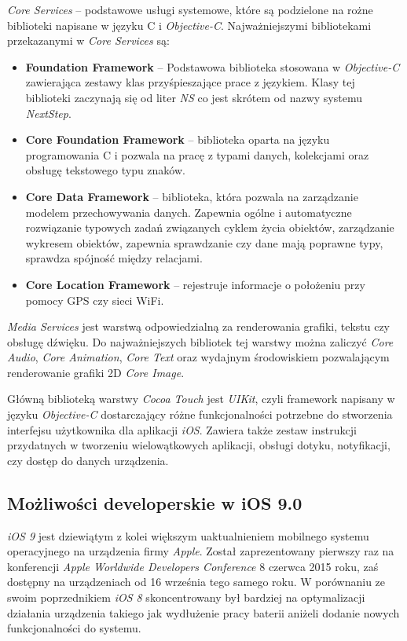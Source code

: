 \documentclass{iiuwb}
\begin{document}
\textit{Core Services} -- podstawowe usługi systemowe, które są podzielone na rożne biblioteki napisane w języku C i \textit{Objective-C}. Najważniejszymi bibliotekami przekazanymi w \textit{Core Services} są:
\begin{itemize}
\item \textbf{Foundation Framework} -- Podstawowa biblioteka stosowana w \textit{Objective-C} zawierająca zestawy klas przyśpieszające prace z językiem. Klasy tej biblioteki zaczynają się od liter \textit{NS} co jest skrótem od nazwy systemu \textit{NextStep}.
\item \textbf{Core Foundation Framework} -- biblioteka oparta na języku programowania C i pozwala na pracę z typami danych, kolekcjami oraz obsługę tekstowego typu znaków.
\item \textbf{Core Data Framework} -- biblioteka, która pozwala na zarządzanie modelem przechowywania danych. Zapewnia ogólne i automatyczne rozwiązanie typowych zadań związanych cyklem życia obiektów, zarządzanie wykresem obiektów, zapewnia sprawdzanie czy dane mają poprawne typy, sprawdza spójność między relacjami.
\item \textbf{Core Location Framework} -- rejestruje informacje o położeniu przy pomocy GPS czy sieci WiFi.
\end{itemize} 
\textit{Media Services} jest warstwą odpowiedzialną za renderowania grafiki, tekstu czy obsługę dźwięku. Do najważniejszych bibliotek tej warstwy można zaliczyć \textit{Core Audio}, \textit{Core Animation}, \textit{Core Text} oraz wydajnym środowiskiem pozwalającym renderowanie grafiki 2D \textit{Core Image}.

Główną biblioteką warstwy \textit{Cocoa Touch} jest \textit{UIKit}, czyli framework napisany w języku \textit{Objective-C} dostarczający różne funkcjonalności potrzebne do stworzenia interfejsu użytkownika dla aplikacji \textit{iOS}. Zawiera także zestaw instrukcji przydatnych w tworzeniu wielowątkowych aplikacji, obsługi dotyku, notyfikacji, czy dostęp do danych urządzenia.

\subsection{Możliwości developerskie w iOS 9.0}
\textit{iOS 9} jest dziewiątym z kolei większym uaktualnieniem mobilnego systemu operacyjnego na urządzenia firmy \textit{Apple}. Został zaprezentowany pierwszy raz na konferencji \textit{Apple Worldwide Developers Conference} 8 czerwca  2015 roku, zaś dostępny na urządzeniach od 16 września tego samego roku. W porównaniu ze swoim poprzednikiem \textit{iOS 8} skoncentrowany był bardziej na optymalizacji działania urządzenia takiego jak wydłużenie pracy baterii aniżeli dodanie nowych funkcjonalności do systemu. 
\end{document}
